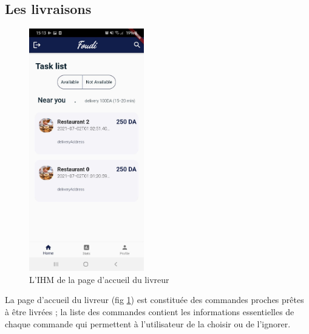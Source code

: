 \documentclass[french, a4paper, 12pt]{report}
\begin{document}
		\subsection{Les livraisons} 
		\begin{figure}[h!]
			\center
			\includegraphics[width=5cm]{screenshots/DeliveryViews/Homepage(list of orders).jpg}
			\caption{L'IHM de la page d'accueil du livreur}
			\label{fig:delihp}
		\end{figure}
		La page d'accueil du livreur (fig \ref{fig:delihp}) est constituée des commandes proches prêtes à être livrées ; la liste des commandes contient les informations essentielles de chaque commande qui permettent à l'utilisateur de la choisir ou de l'ignorer.
		\newpage
\end{document}
